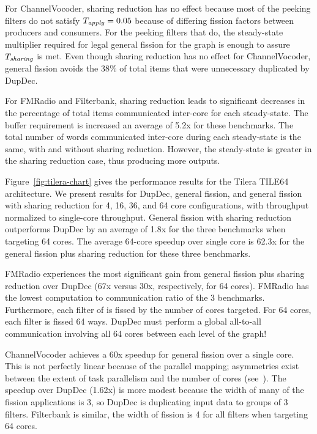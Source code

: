  For ChannelVocoder,
sharing reduction has no effect because most of the peeking filters do
not satisfy $T_{\relax{\it apply}} = 0.05$ because of differing fission
factors between producers and consumers.  For the peeking filters that do,
the steady-state multiplier required for legal general fission for the
graph is enough to assure $T_{\relax{\it sharing}}$ is met.  Even though
sharing reduction has no effect for ChannelVocoder, general fission
avoids the 38\% of total items that were unnecessary duplicated by
DupDec.

For FMRadio and Filterbank, sharing reduction leads to significant
decreases in the percentage of total items communicated inter-core for
each steady-state.  The buffer requirement is increased an average of
5.2x for these benchmarks.  The total number of words communicated
inter-core during each steady-state is the same, with and without
sharing reduction.  However, the steady-state is greater in the
sharing reduction case, thus producing more outputs.


Figure~\ref{fig:tilera-chart} gives the performance results for the
Tilera TILE64 architecture.  We present results for DupDec, general
fission, and general fission with sharing reduction for 4, 16, 36, and
64 core configurations, with throughput normalized to single-core
throughput.  General fission with sharing reduction outperforms
DupDec by an average of 1.8x for the three benchmarks when targeting
64 cores. The average 64-core speedup over single core is 62.3x for the
general fission plus sharing reduction for these three benchmarks.

FMRadio experiences the most significant gain from general fission
plus sharing reduction over DupDec (67x versus 30x, respectively, for
64 cores).  FMRadio has the lowest computation to communication ratio
of the 3 benchmarks.  Furthermore, each filter of is fissed by the
number of cores targeted.  For 64 cores, each filter is fissed 64
ways.  DupDec must perform a global all-to-all communication involving
all 64 cores between each level of the graph!
 
ChannelVocoder achieves a 60x speedup for general fission over a
single core.  This is not perfectly linear because of the parallel
mapping; asymmetries exist between the extent of task parallelism and
the number of cores (see~\cite{gordon-asplos06}).  The speedup over
DupDec (1.62x) is more modest because the width of many of the
fission applications is 3, so DupDec is duplicating input data to
groups of 3 filters.  Filterbank is similar, the width of fission is 4
for all filters when targeting 64 cores.

